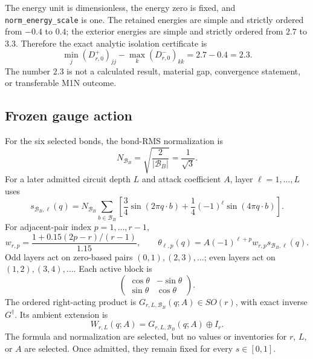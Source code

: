 \documentclass[11pt]{article}
\newcommand{\BB}{\mathcal B_B}
\begin{document}
The energy unit is dimensionless, the energy zero is fixed, and
\texttt{norm\_energy\_scale} is one.  The retained energies are simple and strictly
ordered from $-0.4$ to $0.4$; the exterior energies are simple and strictly ordered
from $2.7$ to $3.3$.  Therefore the exact analytic isolation certificate is
\begin{equation}
 \min_j(D^+_{r,0})_{jj}-\max_k(D^-_{r,0})_{kk}=2.7-0.4=2.3.
\end{equation}
The number $2.3$ is not a calculated result, material gap, convergence statement, or
transferable M1N outcome.

\subsection{Frozen gauge action}

For the six selected bonds, the bond-RMS normalization is
\begin{equation}
 N_{\BB}=\sqrt{\frac{2}{|\BB|}}=\frac1{\sqrt3}.
\end{equation}
For a later admitted circuit depth $L$ and attack coefficient $A$, layer
$\ell=1,\ldots,L$ uses
\begin{equation}
 s_{\BB,\ell}(q)=N_{\BB}\sum_{b\in\BB}
 \left[\frac34\sin(2\pi q\cdot b)
 +\frac14(-1)^\ell\sin(4\pi q\cdot b)\right].
\end{equation}
For adjacent-pair index $p=1,\ldots,r-1$,
\begin{equation}
 w_{r,p}=\frac{1+0.15(2p-r)/(r-1)}{1.15},
 \qquad
 \theta_{\ell,p}(q)=A(-1)^{\ell+p}w_{r,p}s_{\BB,\ell}(q).
\end{equation}
Odd layers act on zero-based pairs $(0,1),(2,3),\ldots$; even layers act on
$(1,2),(3,4),\ldots$.  Each active block is
\begin{equation}
 \begin{pmatrix}\cos\theta&-\sin\theta\\
                 \sin\theta& \cos\theta\end{pmatrix}.
\end{equation}
The ordered right-acting product is $G_{r,L,\BB}(q;A)\in SO(r)$, with exact inverse
$G^\dagger$.  Its ambient extension is
\begin{equation}
 W_{r,L}(q;A)=G_{r,L,\BB}(q;A)\oplus I_r.
\end{equation}
The formula and normalization are selected, but no values or inventories for $r$, $L$,
or $A$ are selected.  Once admitted, they remain fixed for every $s\in[0,1]$.
\end{document}
